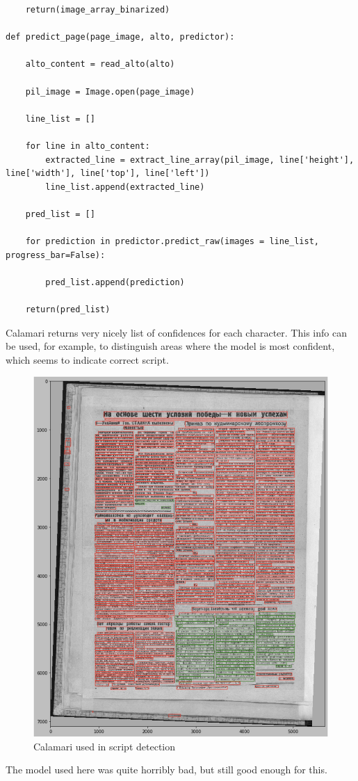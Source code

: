 \documentclass[]{book}
\begin{document}
\begin{verbatim}
    return(image_array_binarized)

def predict_page(page_image, alto, predictor):
    
    alto_content = read_alto(alto)
    
    pil_image = Image.open(page_image)
    
    line_list = []

    for line in alto_content:
        extracted_line = extract_line_array(pil_image, line['height'], line['width'], line['top'], line['left'])
        line_list.append(extracted_line)
    
    pred_list = []
    
    for prediction in predictor.predict_raw(images = line_list, progress_bar=False):

        pred_list.append(prediction)
        
    return(pred_list)
\end{verbatim}

Calamari returns very nicely list of confidences for each character. This info can be used, for example, to distinguish areas where the model is most confident, which seems to indicate correct script.

\begin{figure}
\centering
\includegraphics{images/calamari_script_detector.jpg}
\caption{Calamari used in script detection}
\end{figure}

The model used here was quite horribly bad, but still good enough for this.


\end{document}
